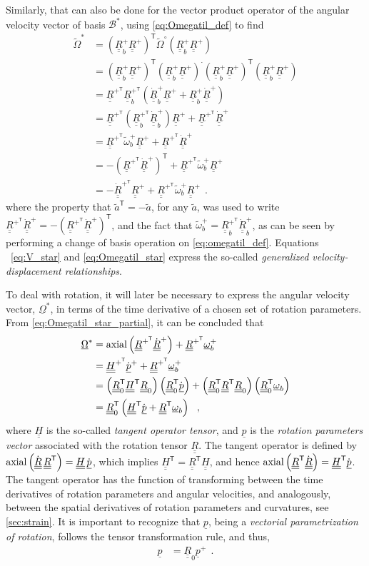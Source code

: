 \documentclass[12pt,a4paper,oneside,english]{abntex2} %
\newcommand{\fix}[1]{{\color{red}#1}}
\newcommand{\vect}[1]{\underline{#1}}
\def\tens#1{\underline{\underline{#1}}}
\def\til#1{\widetilde{#1}}
\def\lp{\left(}
\def\rp{\right)}
\def\T{\mathsf{T}}
\def\B*{\mathcal{B}^*}
\def\axial{\textnormal{axial}}
\def\dotout{^{\boldsymbol{\cdot}}}
\def\R{\tens{R}}
\def\RT{\R^\T}
\def\Rdot{\dot{\R}}
\def\Rp{\R^+}
\def\RpT{\R^{+^\T}}
\def\Rpdot{\dot{\R}^{+}}
\def\RpTdot{\dot{\R}^{+^\T}}
\def\Rbp{\R^{+}_b}
\def\RbpT{\R^{+^\T}_b}
\def\Rbpdot{\dot{\R}^{+}_b}
\def\Rz{\R_0}
\def\RzT{\R^\T_0}
\def\om{\vect{\omega}_b}
\def\omp{\om^{+}}
\def\omtil{\til{\omega}_b}
\def\omtilp{\omtil^{+}}
\def\Om{\vect{\Omega}}
\def\Oms{\Om^{*}}
\def\Omtil{\til{\Omega}}
\def\Omtils{\Omtil^{*}}
\def\Omtilo{\Omtil^{\circ}}
\def\H{\tens{H}}
\def\HT{\H^\T}
\def\HpT{\H^{+^\T}}
\def\p{\vect{p}}
\def\pdot{\dot{\p}}
\def\pplus{\p^{+}}
\def\ppdot{\pdot^{+}}
\begin{document}
Similarly, that can also be done for the vector product operator of the angular velocity vector of basis $\B*$, using \cref{eq:Omegatil_def} to find
\begin{align}
    \Omtils &= \lp\Rbp\Rp\rp^\T\Omtilo\lp\Rbp\Rp\rp \label{eq:Omegatil_initial} 
    \\
    &= \lp\Rbp\Rp\rp^\T\lp\Rbp\Rp\rp\dotout \lp\Rbp\Rp\rp^\T\lp\Rbp\Rp\rp \nonumber 
    \\
    &= \RpT\RbpT\lp\Rbpdot\Rp + \Rbp\Rpdot\rp \nonumber 
    \\
    &= \RpT\lp\RbpT\Rbpdot\rp\Rp + \RpT\Rpdot \nonumber 
    \\
    &= \RpT\omtilp\Rp + \RpT\Rpdot \label{eq:Omegatil_star_partial} 
    \\
    &= -\lp\RpT\Rpdot\rp^\T + \RpT\omtilp\Rp \nonumber 
    \\
    &= -\RpTdot\Rp + \RpT\omtilp\Rp \ \ .
    \label{eq:Omegatil_star}
\end{align}
where the property that $\til{a}^\T = -\til{a}$, for any $\til{a}$, was used to write $\RpT\Rpdot = -\lp\RpT\Rpdot\rp^\T$, and the fact that $\omtilp = \RbpT\Rbpdot$, as can be seen by performing a change of basis operation on \cref{eq:omegatil_def}. Equations ~\eqref{eq:V_star} and \eqref{eq:Omegatil_star} express the so-called \textit{generalized velocity-displacement relationships}. 

To deal with rotation, it will later be necessary to express the angular velocity vector, $\Oms$, in terms of the time derivative of a chosen set of rotation parameters. From  \cref{eq:Omegatil_star_partial}, it can be concluded that
\begin{align}
    \Oms &= \axial\lp\RpT\Rpdot\rp + \RpT\omp \nonumber 
    \\
    &= \HpT\ppdot + \RpT\omp 
    \label{eq:Omega_star_rotparp} 
    \\
    &= \lp\RzT\HT\Rz\rp \lp\RzT\pdot\rp + \lp\RzT\RT\Rz\rp \lp\RzT\om\rp \nonumber \\
    &= \RzT\lp\HT\pdot+\RT\om\rp \ \ ,
    \label{eq:Omega_star_rotpar}
\end{align}
where $\H$ is the so-called \textit{tangent operator tensor}, and $\p$ is the \textit{rotation parameters vector} \cite{bauchau2011flexible} associated with the rotation tensor $\R$. \fix{The tangent operator is defined by $\axial\lp\Rdot\,\RT\rp=\H\,\pdot$, which implies $\HT=\RT\H$, and hence $\axial\lp\RT\Rdot\rp=\HT\pdot$.} The tangent operator has the function of transforming between the time derivatives of rotation parameters and angular velocities, and analogously, between the spatial derivatives of rotation parameters and curvatures, see \cref{sec:strain}. It is important to recognize that $\p$, being a \textit{vectorial parametrization of rotation}, follows the tensor transformation rule, and thus,
\begin{align}
    \p &= \Rz\pplus \ \ .
    \label{eq:rotpar}
\end{align}
\end{document}
